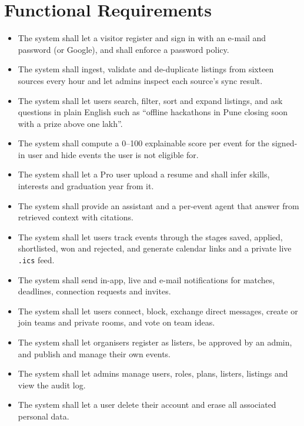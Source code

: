 \documentclass[12pt,a4paper]{report}
\begin{document}
\section{Functional Requirements}
\begin{itemize}[leftmargin=*]
    \item The system shall let a visitor register and sign in with an e-mail and password (or Google), and shall enforce a password policy.
    \item The system shall ingest, validate and de-duplicate listings from sixteen sources every hour and let admins inspect each source's sync result.
    \item The system shall let users search, filter, sort and expand listings, and ask questions in plain English such as ``offline hackathons in Pune closing soon with a prize above one lakh''.
    \item The system shall compute a 0--100 explainable score per event for the signed-in user and hide events the user is not eligible for.
    \item The system shall let a Pro user upload a resume and shall infer skills, interests and graduation year from it.
    \item The system shall provide an assistant and a per-event agent that answer from retrieved context with citations.
    \item The system shall let users track events through the stages saved, applied, shortlisted, won and rejected, and generate calendar links and a private live \texttt{.ics} feed.
    \item The system shall send in-app, live and e-mail notifications for matches, deadlines, connection requests and invites.
    \item The system shall let users connect, block, exchange direct messages, create or join teams and private rooms, and vote on team ideas.
    \item The system shall let organisers register as listers, be approved by an admin, and publish and manage their own events.
    \item The system shall let admins manage users, roles, plans, listers, listings and view the audit log.
    \item The system shall let a user delete their account and erase all associated personal data.
\end{itemize}
\end{document}
